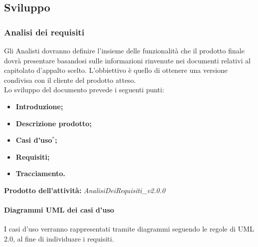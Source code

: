 \documentclass[11pt,a4paper]{article}
\begin{document}
{	
	
	
	\subsection{Sviluppo}
	\subsubsection{Analisi dei requisiti}
	Gli Analisti dovranno definire l'insieme delle funzionalità che il prodotto finale dovrà presentare basandosi sulle informazioni rinvenute nei documenti relativi al capitolato d'appalto scelto. L'obbiettivo è quello di ottenere una versione condivisa con il cliente del prodotto atteso.\\
	Lo sviluppo del documento prevede i seguenti punti:	
	\begin{itemize}
		\item \textbf{Introduzione;}
		\item \textbf{Descrizione prodotto;}
		\item \textbf{Casi d'uso$^*$;}
		\item \textbf{Requisiti;}
		\item \textbf{Tracciamento.}
	\end{itemize}
	
	\textbf{Prodotto dell'attività:} \textit{AnalisiDeiRequisiti\_v2.0.0}
	
	\paragraph{Diagrammi UML dei casi d'uso\\}
	 I casi d'uso verranno rappresentati tramite diagrammi seguendo le regole di UML 2.0, al fine di individuare i requisiti.
}
\end{document}
